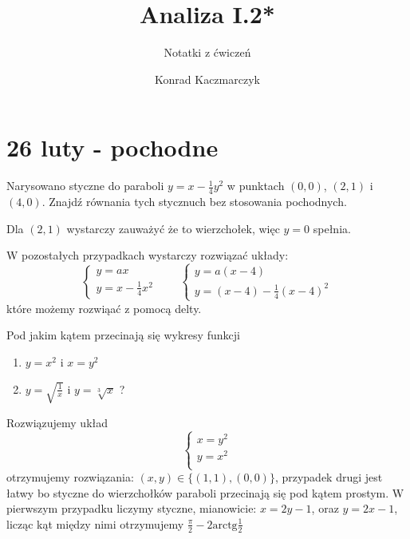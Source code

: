 \documentclass[11pt]{scrartcl}
\author{Konrad Kaczmarczyk}
\begin{document}
  \title{Analiza I.2*}
  \subtitle{Notatki z ćwiczeń}
 \maketitle
 \section{26 luty - pochodne}
     
  \begin{zadanie}
      Narysowano styczne do paraboli $y = x - \frac{1}{4} y^2$ w punktach $\left ( 0, 0 \right )$, $\left ( 2,1 \right )$ i $\left ( 4, 0 \right )$. Znajdź równania tych stycznuch bez stosowania pochodnych.
  \end{zadanie}
  
  \begin{walk}
      \item Dla $\left ( 2, 1 \right )$ wystarczy zauważyć że to wierzchołek, więc $y = 0$ spełnia.
      \item W pozostałych przypadkach wystarczy rozwiązać układy:
        \[
            \begin{cases}
                y = ax \\
                y = x - \frac{1}{4} x^2
            \end{cases}
            \qquad
            \begin{cases}
                y = a (x-4) \\
                y = (x-4) - \frac{1}{4} (x -4)^2
            \end{cases}
        \]
        które możemy rozwiąać z pomocą delty.
  \end{walk}
  \begin{zadanie}
      Pod jakim kątem przecinają się wykresy funkcji 
      \begin{enumerate}
          \item $ y = x^2 $ i $x = y^2$
          \item $y = \sqrt{\frac{1}{x}}$ i $y = \sqrt[3]{x}$ ?
      \end{enumerate}
  \end{zadanie}

  \begin{walk}
      \item Rozwiązujemy układ
        \[
            \begin{cases}
                x = y^2 \\
                y = x^2 \\
            \end{cases}
        \]
        otrzymujemy rozwiązania: $\left ( x, y \right ) \in \{\left ( 1,1 \right ), \left ( 0, 0 \right )\}$, przypadek drugi jest łatwy bo styczne do wierzchołków paraboli przecinają się pod kątem prostym.
        W pierwszym przypadku liczymy styczne, mianowicie: $x= 2y -1$, oraz $y= 2x -1$, licząc kąt między nimi otrzymujemy $\frac{\pi}{2} - 2 \text{arctg} \frac{1}{2}$
        
        \item 
  \end{walk}
  
\end{document}
